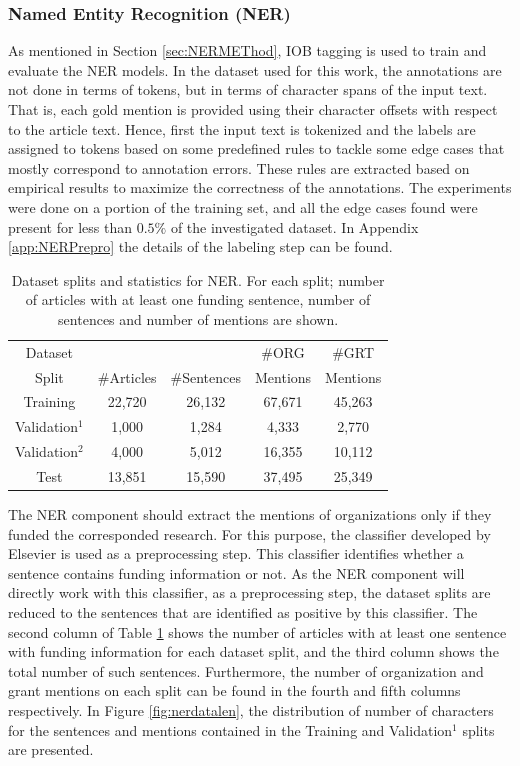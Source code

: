 \documentclass{report}
\theoremstyle{definition}
\theoremstyle{remark}
\begin{document}
\subsubsection{Named Entity Recognition (NER)}
As mentioned in Section \ref{sec:NERMEThod}, IOB tagging is used to train and evaluate the NER models. In the dataset used for this work, the annotations are not done in terms of tokens, but in terms of character spans of the input text. That is, each gold mention is provided using their character offsets with respect to the article text. Hence, first the input text is tokenized and the labels are assigned to tokens based on some predefined rules to tackle some edge cases that mostly correspond to annotation errors. These rules are extracted based on empirical results to maximize the correctness of the annotations. The experiments were done on a portion of the training set, and all the edge cases found were present for less than $0.5\%$ of the investigated dataset. In Appendix \ref{app:NERPrepro} the details of the labeling step can be found.

\begin{table}[h!]
    \centering
    \begin{tabular}{ccccc}
    Dataset &  &  &\#ORG& \#GRT  \\
    Split & \#Articles & \#Sentences &Mentions&Mentions \\
    \hline
    Training   &22,720&26,132& 67,671 &45,263 \\
    Validation$^{1}$ &1,000&1,284&4,333&2,770\\
    Validation$^{2}$ &4,000&5,012&16,355 & 10,112\\
    Test & 13,851 & 15,590 &37,495&25,349\\
    \end{tabular}
    \caption{Dataset splits and statistics for NER. For each split; number of articles with at least one funding sentence, number of sentences and number of mentions are shown.}
    \label{tab:goldstatsner}
\end{table}

The NER component should extract the mentions of organizations only if they funded the corresponded research. For this purpose, the classifier developed by Elsevier is used as a preprocessing step. This classifier identifies whether a sentence contains funding information or not. As the NER component will directly work with this classifier, as a preprocessing step, the dataset splits are reduced to the sentences that are identified as positive by this classifier. The second column of Table \ref{tab:goldstatsner} shows the number of articles with at least one sentence with funding information for each dataset split, and the third column shows the total number of such sentences. Furthermore, the number of organization and grant mentions on each split can be found in the fourth and fifth columns respectively. In Figure \ref{fig:nerdatalen}, the distribution of number of characters for the sentences and mentions contained in the Training and Validation$^1$ splits are presented.
\end{document}
